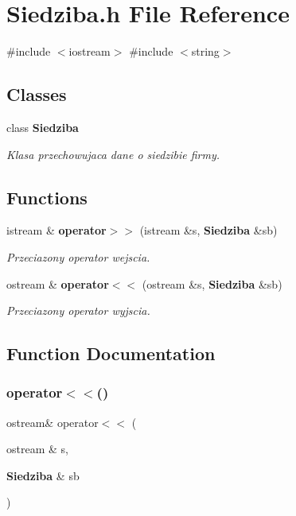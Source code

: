 \section{Siedziba.\+h File Reference}
\label{_siedziba_8h}
{\ttfamily \#include $<$iostream$>$}\newline
{\ttfamily \#include $<$string$>$}\newline
\subsection*{Classes}
\begin{DoxyCompactItemize}
\item 
class \textbf{ Siedziba}
\begin{DoxyCompactList}\small\item\em Klasa przechowujaca dane o siedzibie firmy. \end{DoxyCompactList}\end{DoxyCompactItemize}
\subsection*{Functions}
\begin{DoxyCompactItemize}
\item 
istream \& \textbf{ operator$>$$>$} (istream \&s, \textbf{ Siedziba} \&sb)
\begin{DoxyCompactList}\small\item\em Przeciazony operator wejscia. \end{DoxyCompactList}\item 
ostream \& \textbf{ operator$<$$<$} (ostream \&s, \textbf{ Siedziba} \&sb)
\begin{DoxyCompactList}\small\item\em Przeciazony operator wyjscia. \end{DoxyCompactList}\end{DoxyCompactItemize}


\subsection{Function Documentation}
\mbox{\label{_siedziba_8h_a9f6b107d8d81cef2e0ed0a865b1790f9}} 
\subsubsection{operator$<$$<$()}
{\footnotesize\ttfamily ostream\& operator$<$$<$ (\begin{DoxyParamCaption}\item[{ostream \&}]{s,  }\item[{\textbf{ Siedziba} \&}]{sb }\end{DoxyParamCaption})}



